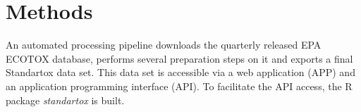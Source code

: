 \section{Methods}
An automated processing pipeline downloads the quarterly released EPA ECOTOX database, performs several preparation steps on it and exports a final Standartox data set. This data set is accessible via a web application (APP) and an application programming interface (API). To facilitate the API access, the R \citep{rcoreteam_language_2017} package \textit{standartox} is built.

